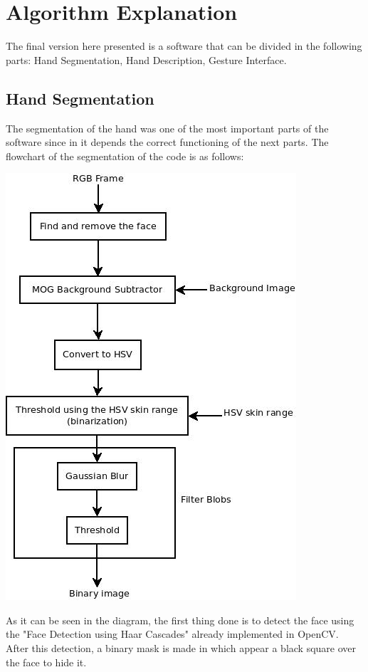 \section{Algorithm Explanation}

The final version here presented is a software that can be divided in the following parts: Hand Segmentation, Hand Description, Gesture Interface.

\subsection{Hand Segmentation}
The segmentation of the hand was one of the most important parts of the software since in it depends the correct functioning of the next parts. 
The flowchart of the segmentation of the code is as follows: 

\begin{center}
 \includegraphics[scale=0.4]{../hand_filter.jpeg} 
 \end{center} 
 
As it can be seen in the diagram, the first thing done is to detect the face using the "Face Detection using Haar Cascades" already implemented in OpenCV. After this detection, a binary mask is made in which appear a black square over the face to hide it.

